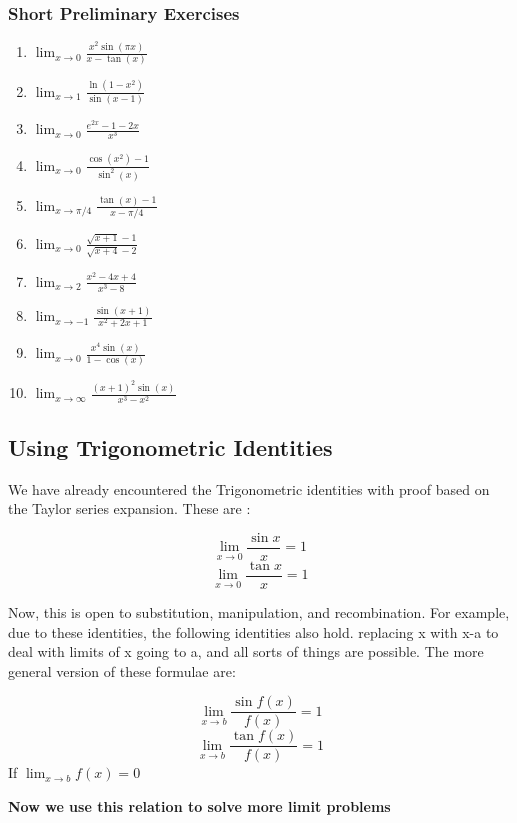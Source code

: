 \subsubsection{Short Preliminary Exercises}
\begin{enumerate}
\item $\lim_{x \to 0} \frac{x^2 \sin(\pi x)}{x - \tan(x)}$
\item $\lim_{x \to 1} \frac{\ln(1 - x^2)}{\sin(x - 1)}$
\item $\lim_{x \to 0} \frac{e^{2x} - 1 - 2x}{x^3}$
\item $\lim_{x \to 0} \frac{\cos(x^2) - 1}{\sin^2(x)}$
\item $\lim_{x \to \pi/4} \frac{\tan(x) - 1}{x - \pi/4}$
\item $\lim_{x \to 0} \frac{\sqrt{x + 1} - 1}{\sqrt{x + 4} - 2}$
\item $\lim_{x \to 2} \frac{x^2 - 4x + 4}{x^3 - 8}$
\item $\lim_{x \to -1} \frac{\sin(x + 1)}{x^2 + 2x + 1}$
\item $\lim_{x \to 0} \frac{x^4 \sin(x)}{1 - \cos(x)}$
\item $\lim_{x \to \infty} \frac{(x + 1)^2 \sin(x)}{x^3 - x^2}$
\end{enumerate}


\subsection{Using Trigonometric Identities}

We have already encountered the Trigonometric identities with proof based on the Taylor series expansion. These are :

\begin{outline}
    $$\lim_{x\to 0}\frac{\sin x}{x}=1$$ $$\lim_{x\to 0} \frac{\tan x}{x}=1$$
\end{outline}

Now, this is open to substitution, manipulation, and recombination. For example, due to these identities, the following identities also hold. 
replacing x with x-a to deal with limits of x going to a, and all sorts of things are possible. The more general version of these formulae are:

\begin{outline}
    $$\lim_{x\to b}\frac{\sin f(x)}{f(x)}=1$$ $$\lim_{x\to b} \frac{\tan f(x)}{f(x)}=1$$
    If $\lim_{x\to b} f(x)=0$
\end{outline}

\textbf{Now we use this relation to solve more limit problems}

